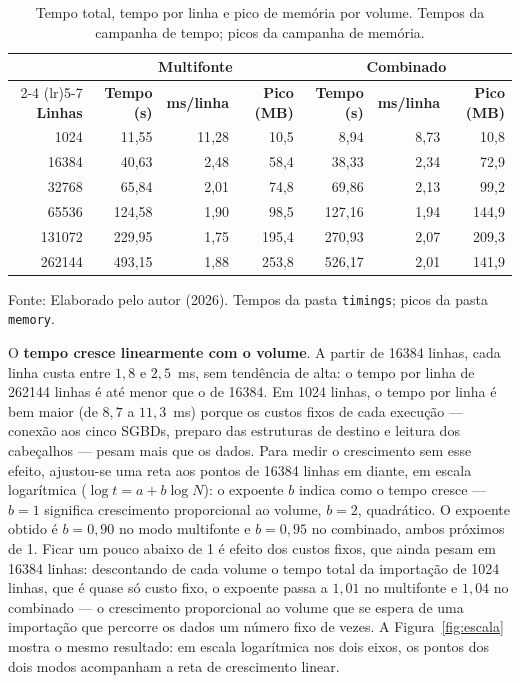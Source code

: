 \begin{table}[H]
  \caption{Tempo total, tempo por linha e pico de memória por volume. Tempos da campanha de tempo; picos da campanha de memória.}
  \label{tab:escala}
  \centering
  \begin{tabular}{r r r r r r r}
    \toprule
    & \multicolumn{3}{c}{\textbf{Multifonte}} & \multicolumn{3}{c}{\textbf{Combinado}} \\
    \cmidrule(lr){2-4} \cmidrule(lr){5-7}
    \textbf{Linhas} & \textbf{Tempo (s)} & \textbf{ms/linha} & \textbf{Pico (MB)} & \textbf{Tempo (s)} & \textbf{ms/linha} & \textbf{Pico (MB)} \\
    \midrule
    \num{1024}   &  11{,}55 & 11{,}28 & 10{,}5 &   8{,}94 & 8{,}73 & 10{,}8 \\
    \num{16384}  &  40{,}63 & 2{,}48 & 58{,}4 &  38{,}33 & 2{,}34 & 72{,}9 \\
    \num{32768}  &  65{,}84 & 2{,}01 & 74{,}8 &  69{,}86 & 2{,}13 & 99{,}2 \\
    \num{65536}  & 124{,}58 & 1{,}90 & 98{,}5 & 127{,}16 & 1{,}94 & 144{,}9 \\
    \num{131072} & 229{,}95 & 1{,}75 & 195{,}4 & 270{,}93 & 2{,}07 & 209{,}3 \\
    \num{262144} & 493{,}15 & 1{,}88 & 253{,}8 & 526{,}17 & 2{,}01 & 141{,}9 \\
    \bottomrule
  \end{tabular}
  \par\vspace{4pt}
  {\footnotesize Fonte: Elaborado pelo autor (2026). Tempos da pasta \texttt{timings}; picos da pasta \texttt{memory}.}
\end{table}

O \textbf{tempo cresce linearmente com o volume}. A partir de \num{16384} linhas, cada
linha custa entre $1{,}8$ e $2{,}5$~ms, sem tendência de alta: o tempo por linha de
\num{262144} linhas é até menor que o de \num{16384}. Em \num{1024} linhas, o tempo por
linha é bem maior (de $8{,}7$ a $11{,}3$~ms) porque os custos fixos de cada execução --- conexão aos cinco
SGBDs, preparo das estruturas de destino e leitura dos cabeçalhos --- pesam mais que os
dados. Para medir o crescimento sem esse efeito, ajustou-se uma reta aos pontos de
\num{16384} linhas em diante, em escala logarítmica ($\log t = a + b \log N$): o expoente
$b$ indica como o tempo cresce --- $b = 1$ significa crescimento proporcional ao volume,
$b = 2$, quadrático. O expoente obtido é $b = 0{,}90$ no modo multifonte e $b = 0{,}95$ no
combinado, ambos próximos de 1. Ficar um pouco abaixo de 1 é efeito dos custos fixos, que
ainda pesam em \num{16384} linhas: descontando de cada volume o tempo total da importação
de \num{1024} linhas, que é quase só custo fixo, o expoente passa a $1{,}01$ no multifonte e
$1{,}04$ no combinado --- o crescimento proporcional ao volume que se espera de uma
importação que percorre os dados um número fixo de vezes. A Figura~\ref{fig:escala} mostra o mesmo resultado: em
escala logarítmica nos dois eixos, os pontos dos dois modos acompanham a reta de
crescimento linear.

